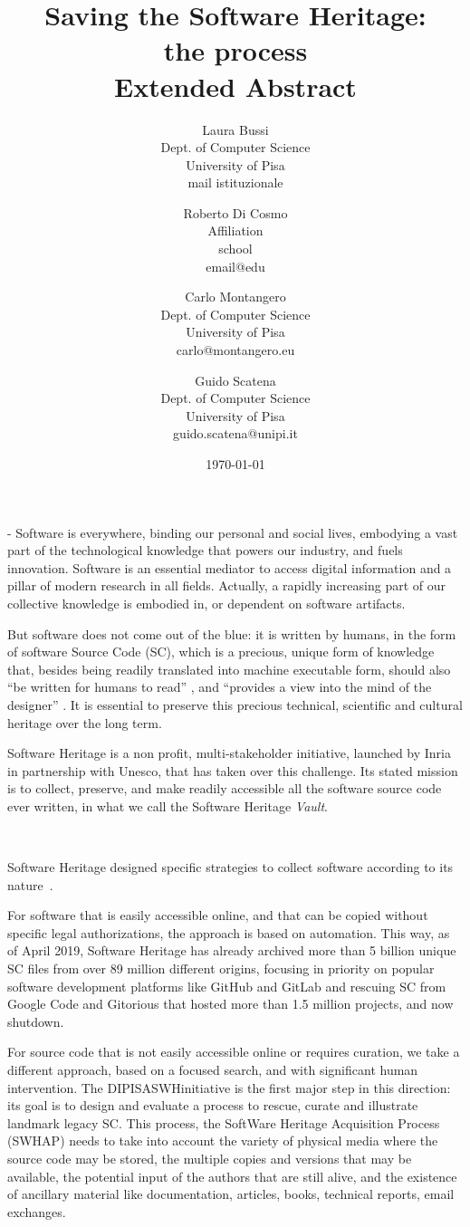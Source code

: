 \documentclass[a4paper]{article}
\title{Saving the Software Heritage:
				\\ the process  
				\\ 	\large Extended Abstract
}
\author{
    Laura Bussi\\
    Dept. of Computer Science\\
    University of Pisa\\
    mail istituzionale
	\and
    Roberto Di Cosmo\\
    Affiliation\\
    school\\
    email@edu
  \and
    Carlo Montangero\\
    Dept. of Computer Science\\
    University of Pisa\\
    carlo@montangero.eu
  \and
    Guido Scatena\\
		Dept. of Computer Science\\
    University of Pisa\\
    guido.scatena@unipi.it
}
\date{\today}
\newcommand{\DIPISASWHinitiative}{DIPISASWHinitiative }
\begin{document}
\maketitle

 - Software is everywhere,  binding our personal and social lives, embodying a vast part of the technological knowledge that powers our industry, and fuels innovation. Software is an essential mediator to access digital information and a pillar of modern research in all fields. Actually, a rapidly increasing part of our collective knowledge is embodied in, or dependent on software artifacts. 

But software does not come out of the blue: it is written by humans, in the form of software Source Code (SC), which is a precious, unique form of knowledge that, besides being readily translated into machine executable form, should also "`be written for humans to read"' \cite{AbelsonS85}, and "`provides a view into the mind of the designer"' \cite{Shustek06}. It is essential to preserve this precious technical, scientific and cultural heritage over the long term.
\

\noindent
Software Heritage is a non profit, multi-stakeholder initiative, launched by Inria in partnership with Unesco, that has taken over this challenge. Its stated mission is to collect, preserve, and make readily accessible all the software source code ever written, in what we call the Software Heritage \emph{Vault}. 

\

\noindent
Software Heritage designed specific strategies to collect software according to its nature~\cite{Abramatic:2018:BUA:3281635.3183558}. 

For software that is easily accessible online, and that can be copied without specific legal authorizations, the approach is based on automation. This way, as of April 2019, Software Heritage has already archived more than 5 billion unique SC files from over 89 million different origins, focusing in priority on popular software development platforms like GitHub and GitLab and rescuing SC from Google Code and Gitorious that hosted more than 1.5 million projects, and now shutdown.

For source code that is not easily accessible online or requires curation, we take a different approach, based on a focused search, and with significant human intervention. The \DIPISASWHinitiative is the first major step in this direction: its goal is to design and evaluate a process to rescue, curate and illustrate landmark legacy SC. This process, the SoftWare Heritage Acquisition Process (SWHAP) needs to take into account the variety of physical media where the source code may be stored, the multiple copies and versions that may be available, the potential input of the authors that are still alive, and the existence of ancillary material like documentation, articles, books, technical reports, email exchanges.
\end{document}
